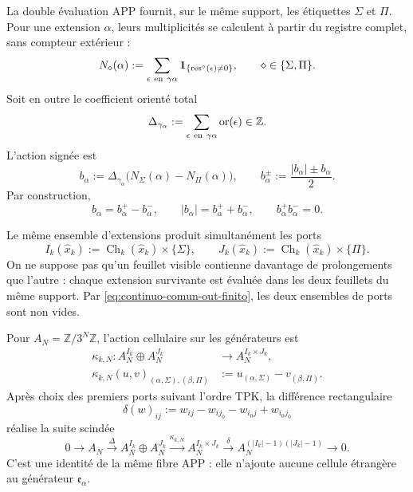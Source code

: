 La double évaluation APP fournit, sur le même support, les étiquettes \(\Sigma\) et \(\Pi\). Pour une extension \(\alpha\), leurs multiplicités se calculent à partir du registre complet, sans compteur extérieur :
\begin{equation}
\label{eq:pdfv2-cor-multiplicidades-hojas}
 N_\diamond(\alpha):=
 \sum_{\epsilon\ {\rm en}\ \gamma\alpha}
 \mathbf1_{\{\operatorname{res}^{\diamond}(\epsilon)\neq0\}},
 \qquad \diamond\in\{\Sigma,\Pi\}.
\end{equation}
Soit en outre le coefficient orienté total
\[
 \Delta_{\gamma_\alpha}:=
 \sum_{\epsilon\ {\rm en}\ \gamma\alpha}\operatorname{or}(\epsilon)
 \in\mathbb Z.
\]
L'action signée est
\begin{equation}
\label{eq:pdfv2-cor-b-alpha}
 b_\alpha:=\Delta_{\gamma_\alpha}
 \bigl(N_\Sigma(\alpha)-N_\Pi(\alpha)\bigr),
 \qquad
 b_\alpha^\pm:=\frac{|b_\alpha|\pm b_\alpha}{2}.
\end{equation}
Par construction,
\begin{equation}
\label{eq:pdfv2-cor-b-identidades}
 b_\alpha=b_\alpha^+-b_\alpha^-,\qquad
 |b_\alpha|=b_\alpha^++b_\alpha^-,\qquad
 b_\alpha^+b_\alpha^-=0.
\end{equation}

Le même ensemble d'extensions produit simultanément les ports
\begin{equation}
\label{eq:pdfv2-cor-puertos-comunes}
 I_k(\widehat x_k):=
 \operatorname{Ch}_k(\widehat x_k)\times\{\Sigma\},
 \qquad
 J_k(\widehat x_k):=
 \operatorname{Ch}_k(\widehat x_k)\times\{\Pi\}.
\end{equation}
On ne suppose pas qu'un feuillet visible contienne davantage de prolongements que l'autre : chaque extension survivante est évaluée dans les deux feuillets du même support. Par \eqref{eq:continuo-comun-out-finito}, les deux ensembles de ports sont non vides.

Pour \(A_N=\mathbb Z/3^N\mathbb Z\), l'action cellulaire sur les générateurs est
\begin{equation}
\label{eq:pdfv2-cor-kappa-celda}
 \begin{aligned}
 \kappa_{k,N}:A_N^{I_k}\oplus A_N^{J_k}
 &\longrightarrow A_N^{I_k\times J_k},\\
 \kappa_{k,N}(u,v)_{(\alpha,\Sigma),(\beta,\Pi)}
 &:=u_{(\alpha,\Sigma)}-v_{(\beta,\Pi)}.
 \end{aligned}
\end{equation}
Après choix des premiers ports suivant l'ordre TPK, la différence rectangulaire
\begin{equation}
\label{eq:pdfv2-cor-delta-celda}
 \delta(w)_{ij}:=w_{ij}-w_{ij_0}-w_{i_0j}+w_{i_0j_0}
\end{equation}
réalise la suite scindée
\begin{equation}
\label{eq:pdfv2-cor-sucesion-celda}
 0\longrightarrow A_N\xrightarrow{\Delta}
 A_N^{I_k}\oplus A_N^{J_k}
 \xrightarrow{\kappa_{k,N}}A_N^{I_k\times J_k}
 \xrightarrow{\delta}A_N^{(|I_k|-1)(|J_k|-1)}
 \longrightarrow0.
\end{equation}
C'est une identité de la même fibre APP : elle n'ajoute aucune cellule étrangère au générateur \(\mathfrak e_\alpha\).

